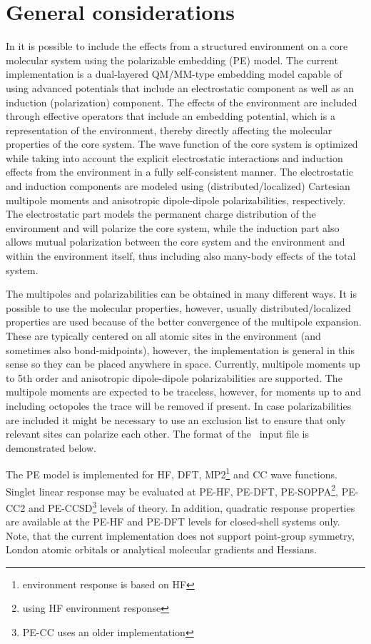 \section{General considerations}
In {\dalton} it is possible to include the effects from a structured environment on a core molecular system using the polarizable embedding (PE) model. The current implementation is a dual-layered QM/MM-type embedding model capable of using advanced potentials that include an electrostatic component as well as an induction (polarization) component. The effects of the environment are included through effective operators that include an embedding potential, which is a representation of the environment, thereby directly affecting the molecular properties of the core system. The wave function of the core system is optimized while taking into account the explicit electrostatic interactions and induction effects from the environment in a fully self-consistent manner. The electrostatic and induction components are modeled using (distributed/localized) Cartesian multipole moments and anisotropic dipole-dipole polarizabilities, respectively. The electrostatic part models the permanent charge distribution of the environment and will polarize the core system, while the induction part also allows mutual polarization between the core system and the environment and within the environment itself, thus including also many-body effects of the total system.

The multipoles and polarizabilities can be obtained in many different ways. It is possible to use the molecular properties, however, usually distributed/localized properties are used because of the better convergence of the multipole expansion. These are typically centered on all atomic sites in the environment (and sometimes also bond-midpoints), however, the implementation is general in this sense so they can be placed anywhere in space. Currently, multipole moments up to 5th order and anisotropic dipole-dipole polarizabilities are supported. The multipole moments are expected to be traceless, however, for moments up to and including octopoles the trace will be removed if present. In case polarizabilities are included it might be necessary to use an exclusion list to ensure that only relevant sites can polarize each other. The format of the \pot\ input file is demonstrated below.

The PE model is implemented for HF, DFT, MP2\footnote{environment response is based on HF} and CC wave functions. Singlet linear response may be evaluated at PE-HF, PE-DFT, PE-SOPPA\footnote{using HF environment response}, PE-CC2 and PE-CCSD\footnote{PE-CC uses an older implementation} levels of theory. In addition, quadratic response properties are available at the PE-HF and PE-DFT levels for closed-shell systems only. Note, that the current implementation does not support point-group symmetry, London atomic orbitals or analytical molecular gradients and Hessians.


